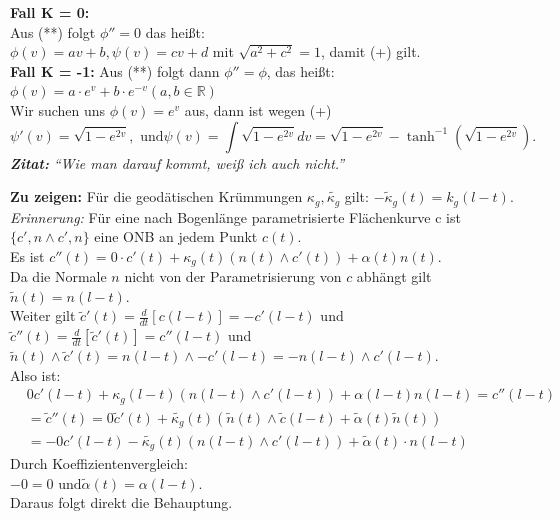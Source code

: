 \begin{problem*}[2b]

  \textbf{Fall K = 0:} \\
  Aus (**) folgt \( \phi'' = 0 \) das heißt: \\
  \( \phi(v) = av + b, \psi(v) = cv + d \) mit \( \sqrt{ a^2 + c^2} = 1 \), damit (+) gilt. \\


  \textbf{Fall K = -1:} Aus (**) folgt dann \( \phi'' = \phi \), das heißt: \\
  \( \phi(v) = a \cdot e^v + b \cdot e^{-v} (a,b \in \mathbb{R}) \) \\
  Wir suchen uns \( \phi(v) = e^v \) aus, dann ist wegen (+)
  \begin{equation*}
    \psi'(v) = \sqrt{ 1- e^{2v}}, \text{ und} \psi(v) = \int{ \sqrt{ 1 - e^{2v}}}dv = \sqrt{ 1 - e^{2v}} -\tanh^{-1}(\sqrt{ 1- e^{2v}}).
  \end{equation*}
  \emph{\textbf{Zitat:}} \emph{``Wie man darauf kommt, weiß ich auch nicht.''}

\end{problem*}

\begin{problem*}[3]
  \textbf{Zu zeigen:} Für die geodätischen Krümmungen \( \kappa_g, \tilde{\kappa_g} \) gilt: \( -\tilde{\kappa}_g(t) = k_g(l-t) \). \\
  \emph{Erinnerung:} Für eine nach Bogenlänge parametrisierte Flächenkurve c ist \( \{ c', n \land c', n \} \) eine ONB an jedem Punkt \( c(t) \). \\
  Es ist \( c''(t) = 0 \cdot c'(t) + \kappa_g(t)(n(t) \land c'(t)) + \alpha(t) n(t) \). \\
  Da die Normale \( n \) nicht von der Parametrisierung von \( c \) abhängt gilt \( \tilde{n}(t) = n(l-t) \). \\
  Weiter gilt \( \tilde{c}'(t) = \frac{d}{dt}[c(l-t)] = - c'(l-t) \) und \\
  \( \tilde{c}''(t) = \frac{d}{dt}[\tilde{c}'(t)] = c''(l-t) \) und \\
  \( \tilde{n}(t) \land \tilde{c}'(t) = n(l-t) \land - c'(l-t) = -n (l-t) \land c'(l-t) \). \\
  Also ist:
  \begin{align*}
    & 0c'(l-t) + \kappa_g(l-t)(n(l-t) \land c'(l-t)) + \alpha(l-t)n(l-t) = c''(l-t) \\
    &= \tilde{c}''(t) = 0\tilde{c}'(t) + \tilde{\kappa_g}(t)(\tilde{n}(t) \land \tilde{c}(l-t) + \tilde{\alpha}(t) \tilde{n}(t)) \\
    &= -0 c'(l-t) - \tilde{\kappa_g}(t)(n(l-t) \land c'(l-t)) + \tilde{\alpha}(t) \cdot n(l-t)
  \end{align*}
  Durch Koeffizientenvergleich: \\
  \( -0 = 0 \text{ und} \tilde{\alpha}(t) = \alpha(l-t) \). \\
  Daraus folgt direkt die Behauptung.
\end{problem*}



